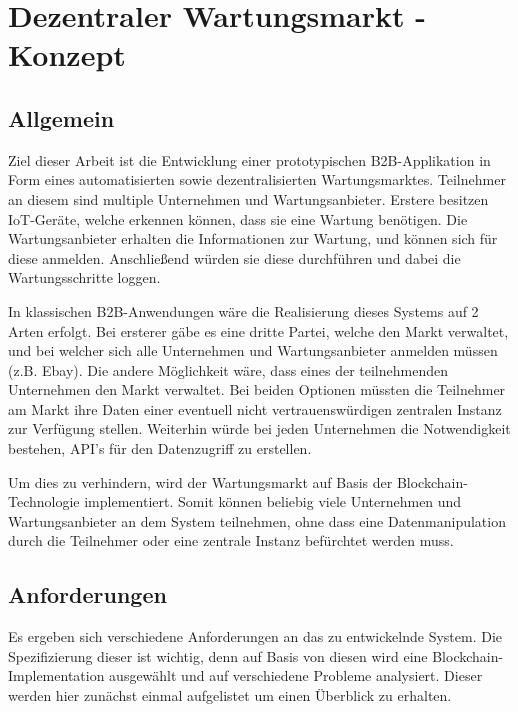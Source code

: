 \chapter{Dezentraler Wartungsmarkt - Konzept}
\label{cha:fazit}

\section{Allgemein}
Ziel dieser Arbeit ist die Entwicklung einer prototypischen B2B-Applikation in Form eines automatisierten sowie dezentralisierten Wartungsmarktes. Teilnehmer an diesem sind multiple Unternehmen und Wartungsanbieter. Erstere besitzen IoT-Geräte, welche erkennen können, dass sie eine Wartung benötigen. Die Wartungsanbieter erhalten die Informationen zur Wartung, und können sich für diese anmelden. Anschließend würden sie diese durchführen und dabei die Wartungsschritte loggen.  

In klassischen B2B-Anwendungen wäre die Realisierung dieses Systems auf 2 Arten erfolgt. Bei ersterer gäbe es eine dritte Partei, welche den Markt verwaltet, und bei welcher sich alle Unternehmen und Wartungsanbieter anmelden müssen (z.B. Ebay). Die andere Möglichkeit wäre, dass eines der teilnehmenden Unternehmen den Markt verwaltet. Bei beiden Optionen müssten die Teilnehmer am Markt ihre Daten einer eventuell nicht vertrauenswürdigen zentralen Instanz zur Verfügung stellen. Weiterhin würde bei jeden Unternehmen die Notwendigkeit bestehen, API's für den Datenzugriff zu erstellen.

Um dies zu verhindern, wird der Wartungsmarkt auf Basis der Blockchain-Technologie implementiert. Somit können beliebig viele Unternehmen und Wartungsanbieter an dem System teilnehmen, ohne dass eine Datenmanipulation durch die Teilnehmer oder eine zentrale Instanz befürchtet werden muss.


\section{Anforderungen}
Es ergeben sich verschiedene Anforderungen an das zu entwickelnde System. Die Spezifizierung dieser ist wichtig, denn auf Basis von diesen wird eine Blockchain-Implementation ausgewählt und auf verschiedene Probleme analysiert. Dieser werden hier zunächst einmal aufgelistet um einen Überblick zu erhalten.

